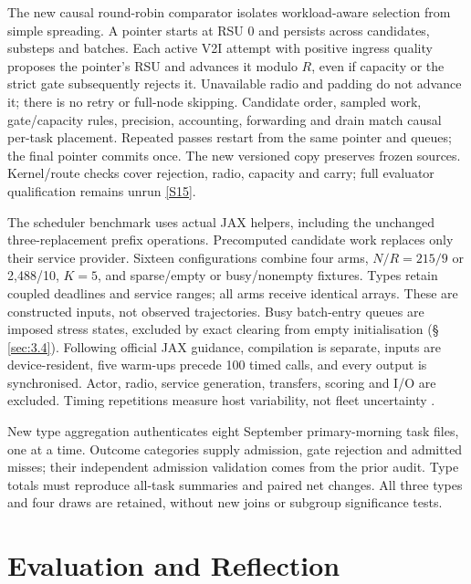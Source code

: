 \documentclass[11pt,a4paper]{article}
\begin{document}
The new causal round-robin comparator isolates workload-aware selection from simple spreading. A pointer starts at RSU 0 and persists across candidates, substeps and batches. Each active V2I attempt with positive ingress quality proposes the pointer's RSU and advances it modulo $R$, even if capacity or the strict gate subsequently rejects it. Unavailable radio and padding do not advance it; there is no retry or full-node skipping. Candidate order, sampled work, gate/capacity rules, precision, accounting, forwarding and drain match causal per-task placement. Repeated passes restart from the same pointer and queues; the final pointer commits once. The new versioned copy preserves frozen sources. Kernel/route checks cover rejection, radio, capacity and carry; full evaluator qualification remains unrun \hyperref[source-s15]{[S15]}.

The scheduler benchmark uses actual JAX helpers, including the unchanged three-replacement prefix operations. Precomputed candidate work replaces only their service provider. Sixteen configurations combine four arms, $N/R=215/9$ or 2,488/10, $K=5$, and sparse/empty or busy/nonempty fixtures. Types retain coupled deadlines and service ranges; all arms receive identical arrays. These are constructed inputs, not observed trajectories. Busy batch-entry queues are imposed stress states, excluded by exact clearing from empty initialisation (\S\,\ref{sec:3.4}). Following official JAX guidance, compilation is separate, inputs are device-resident, five warm-ups precede 100 timed calls, and every output is synchronised. Actor, radio, service generation, transfers, scoring and I/O are excluded. Timing repetitions measure host variability, not fleet uncertainty \cite{ref14}.

New type aggregation authenticates eight September primary-morning task files, one at a time. Outcome categories supply admission, gate rejection and admitted misses; their independent admission validation comes from the prior audit. Type totals must reproduce all-task summaries and paired net changes. All three types and four draws are retained, without new joins or subgroup significance tests.

\section{Evaluation and Reflection}\label{sec:3}
\end{document}
